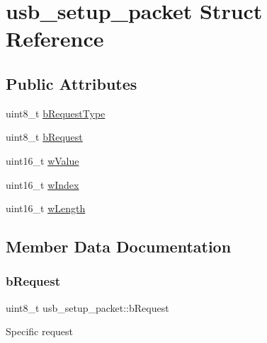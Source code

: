 \hypertarget{structusb__setup__packet}{}\section{usb\+\_\+setup\+\_\+packet Struct Reference}
\label{structusb__setup__packet}
\subsection*{Public Attributes}
\begin{DoxyCompactItemize}
\item 
uint8\+\_\+t \hyperlink{structusb__setup__packet_aaea05f60cc195c4fa77f7c78b5a8bb01}{b\+Request\+Type}
\item 
uint8\+\_\+t \hyperlink{structusb__setup__packet_aab50ed2f2cdcc1d747f6f224fe9d2018}{b\+Request}
\item 
uint16\+\_\+t \hyperlink{structusb__setup__packet_a619fbc1b9b6452f4394da713bdbc6a89}{w\+Value}
\item 
uint16\+\_\+t \hyperlink{structusb__setup__packet_a953c058f0e31481a3d59b404037be009}{w\+Index}
\item 
uint16\+\_\+t \hyperlink{structusb__setup__packet_a3421c921569bf3727534652c5f71da96}{w\+Length}
\end{DoxyCompactItemize}


\subsection{Member Data Documentation}
\mbox{\label{structusb__setup__packet_aab50ed2f2cdcc1d747f6f224fe9d2018}} 
\subsubsection{\texorpdfstring{b\+Request}{bRequest}}
{\footnotesize\ttfamily uint8\+\_\+t usb\+\_\+setup\+\_\+packet\+::b\+Request}

Specific request \mbox{\label{structusb__setup__packet_aaea05f60cc195c4fa77f7c78b5a8bb01}} 
